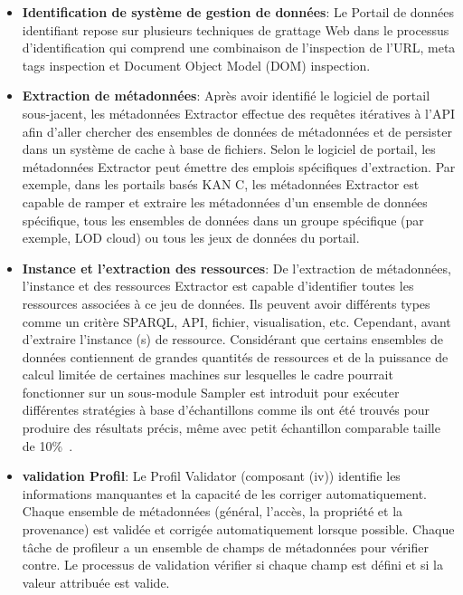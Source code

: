 \documentclass[a4paper,11pt,twoside]{ThesisStyle}
\begin{document}
\begin{itemize}
	\item \textbf{Identification de système de gestion de données}: Le Portail de données identifiant repose sur plusieurs techniques de grattage Web dans le processus d'identification qui comprend une combinaison de l'inspection de l'URL, meta tags inspection et Document Object Model (DOM) inspection.
	\item \textbf{Extraction de métadonnées}: Après avoir identifié le logiciel de portail sous-jacent, les métadonnées Extractor effectue des requêtes itératives à l'API afin d'aller chercher des ensembles de données de métadonnées et de persister dans un système de cache à base de fichiers. Selon le logiciel de portail, les métadonnées Extractor peut émettre des emplois spécifiques d'extraction. Par exemple, dans les portails basés KAN C, les métadonnées Extractor est capable de ramper et extraire les métadonnées d'un ensemble de données spécifique, tous les ensembles de données dans un groupe spécifique (par exemple, LOD cloud) ou tous les jeux de données du portail.
	\item \textbf{Instance et l'extraction des ressources}: De l'extraction de métadonnées, l'instance et des ressources Extractor est capable d'identifier toutes les ressources associées à ce jeu de données. Ils peuvent avoir différents types comme un critère SPARQL, API, fichier, visualisation, etc. Cependant, avant d'extraire l'instance (s) de ressource. Considérant que certains ensembles de données contiennent de grandes quantités de ressources et de la puissance de calcul limitée de certaines machines sur lesquelles le cadre pourrait fonctionner sur un sous-module Sampler est introduit pour exécuter différentes stratégies à base d'échantillons comme ils ont été trouvés pour produire des résultats précis, même avec petit échantillon comparable taille de 10\%~\cite{Fetahu:ESWC:14}.
	\item \textbf{validation Profil}: Le Profil Validator (composant (iv)) identifie les informations manquantes et la capacité de les corriger automatiquement. Chaque ensemble de métadonnées (général, l'accès, la propriété et la provenance) est validée et corrigée automatiquement lorsque possible. Chaque tâche de profileur a un ensemble de champs de métadonnées pour vérifier contre. Le processus de validation vérifier si chaque champ est défini et si la valeur attribuée est valide.


\end{itemize}
\end{document}
